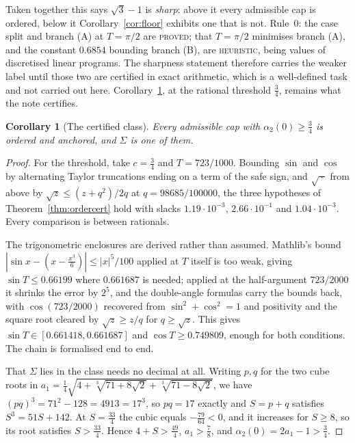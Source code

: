 \documentclass[11pt]{article}
\newtheorem{corollary}[theorem]{Corollary}
\theoremstyle{definition}
\newcommand{\Sig}{\Sigma}
\begin{document}
Taken together this says $\sqrt3-1$ is \emph{sharp}: above it every admissible cap is
ordered, below it Corollary~\ref{cor:floor} exhibits one that is not. Rule~0: the case
split and branch (A) at $T=\pi/2$ are \textsc{proved}; that $T=\pi/2$ minimises branch (A),
and the constant $0.6854$ bounding branch (B), are \textsc{heuristic}, being values of
discretised linear programs. The sharpness statement therefore carries the weaker label
until those two are certified in exact arithmetic, which is a well-defined task and not
carried out here. Corollary~\ref{cor:sigmacert}, at the rational threshold $\tfrac34$,
remains what the note certifies.

\begin{corollary}[The certified class]\label{cor:sigmacert}
Every admissible cap with $\alpha_2(0)\ge\tfrac34$ is ordered and anchored, and $\Sig$ is
one of them.
\end{corollary}

\begin{proof}
For the threshold, take $c=\tfrac34$ and $T=723/1000$. Bounding $\sin$ and $\cos$ by
alternating Taylor truncations ending on a term of the safe sign, and
$\sqrt{\,\cdot\,}$ from above by $\sqrt z\le(z+q^2)/2q$ at $q=98685/100000$, the three
hypotheses of Theorem~\ref{thm:ordercert} hold with slacks $1.19\cdot10^{-3}$,
$2.66\cdot10^{-1}$ and $1.04\cdot10^{-3}$. Every comparison is between rationals.

The trigonometric enclosures are derived rather than assumed. Mathlib's bound
$|\sin x-(x-\tfrac{x^3}6)|\le|x|^5/100$ applied at $T$ itself is too weak, giving
$\sin T\le0.66199$ where $0.661687$ is needed; applied at the half-argument $723/2000$ it
shrinks the error by $2^5$, and the double-angle formulas carry the bounds back, with
$\cos(723/2000)$ recovered from $\sin^2+\cos^2=1$ and positivity and the square root
cleared by $\sqrt z\ge z/q$ for $q\ge\sqrt z$. This gives
$\sin T\in[0.661418,0.661687]$ and $\cos T\ge0.749809$, enough for both conditions. The
chain is formalised end to end.

That $\Sig$ lies in the class needs no decimal at all. Writing $p,q$ for the two cube roots
in $a_1=\tfrac14\sqrt{4+\sqrt[3]{71+8\sqrt2}+\sqrt[3]{71-8\sqrt2}}$, we have
$(pq)^3=71^2-128=4913=17^3$, so $pq=17$ exactly and $S=p+q$ satisfies $S^3=51S+142$. At
$S=\tfrac{33}4$ the cubic equals $-\tfrac{79}{64}<0$, and it increases for $S\ge8$, so its
root satisfies $S>\tfrac{33}4$. Hence $4+S>\tfrac{49}4$, $a_1>\tfrac78$, and
$\alpha_2(0)=2a_1-1>\tfrac34$.
\end{proof}
\end{document}
